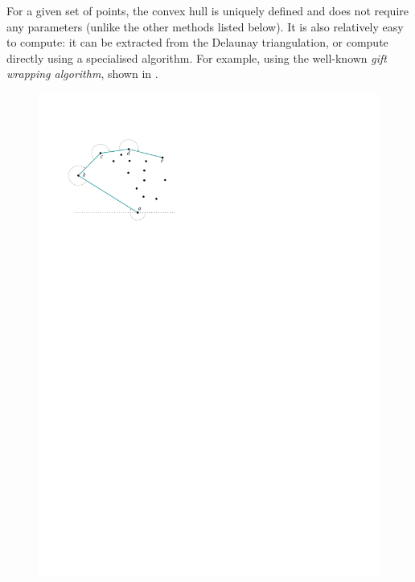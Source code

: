 For a given set of points, the convex hull is uniquely defined and does not require any parameters (unlike the other methods listed below).
It is also relatively easy to compute: it can be extracted from the Delaunay triangulation, or compute directly using a specialised algorithm.
For example, using the well-known \emph{gift wrapping algorithm}, shown in .
\begin{marginfigure}
  \centering
  \begin{subfigure}[b]{\linewidth}
    \centering
    \includegraphics[page=1,width=\textwidth]{figs/giftwrapping.pdf}
    \caption{}
  \end{subfigure}
  \qquad
  \begin{subfigure}[b]{\linewidth}
    \centering

\end{subfigure}
\end{marginfigure}
